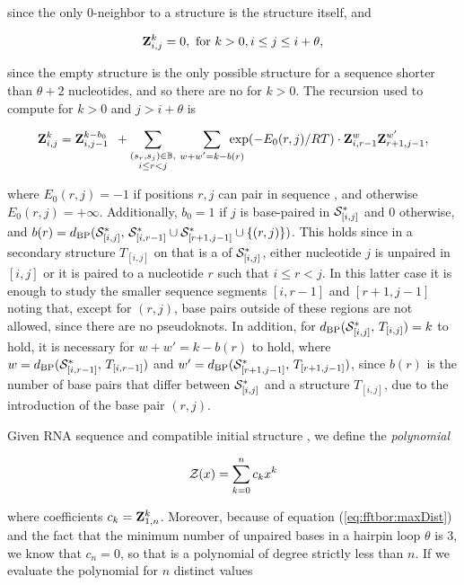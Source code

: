 since the only 0-neighbor to a structure \strSt
is the structure \strSt itself, and

\begin{align}
\label{eq:fftbor:initZpart2}
\bfZ{k}{i,j} = 0, \text{ for } k > 0, i \le j \leq i + \theta,
\end{align}

since the empty structure is the only possible structure for a
sequence shorter than $\theta + 2$ nucleotides, and so there are no
\kNbrs for $k>0$. The recursion used to compute
 for $k > 0$ and $j > i+\theta$ is

\begin{align}
\label{eq:fftbor:bfZkij}
\bfZ{k}{i,j} = \bfZ{k-b_0}{i,j-1}\enspace +
\sum_{\substack{(s_r,s_j) \in \bpSet, \\ i \leq r<j}}\qquad
\sum_{\mathclap{w+w'=k-b(r)}}\enspace
\exp(-E_0(r,j)/RT) \cdot \bfZ{w}{i,r-1} \bfZ{w'}{r+1,j-1},
\end{align}

where $E_0(r,j) = -1$ if positions $r,j$ can pair in sequence \seq,
and otherwise $E_0(r,j) = +\infty$. Additionally,
$b_0 = 1$ if $j$ is base-paired
in $\mathcal S^*_{[i,j]}$ and 0 otherwise, and
$b(r)=d_{\text{BP}}(\mathcal S^*_{[i,j]},\,\mathcal S^*_{[i,r-1]} \cup \mathcal S^*_{[r+1,j-1]} \cup\{(r,j)\})$.
This holds since in a secondary
structure $T_{[i,j]}$ on \seqIJ that is a \kNbr of
$\mathcal S^*_{[i,j]}$,
either nucleotide $j$ is unpaired in $[i,j]$ or it is
paired to a nucleotide $r$ such that $i \leq r < j$. In this
latter case it is enough to study the smaller sequence segments
$[i,r-1]$ and $[r+1,j-1]$ noting that, except for $(r,j)$,
base pairs outside of these regions are not allowed, since there
are no pseudoknots. In addition,
for $d_{\text{BP}}(\mathcal S^*_{[i,j]},\,T_{[i,j]}) = k$ to hold,
it is necessary for $w+w' = k -b(r)$ to hold, where $w =
d_{\text{BP}}(\mathcal S^*_{[i,r-1]},\,T_{[i,r-1]})$ and $w' =
d_{\text{BP}}(\mathcal S^*_{[r+1,j-1]},\,T_{[r+1,j-1]})$, since $b(r)$ is the
number of base pairs that differ between $\mathcal S^*_{[i,j]}$ and a
structure $T_{[i,j]}$, due to the introduction of the base pair
$(r,j)$.

Given RNA sequence \seq and compatible initial structure \strSt,
we define the {\em polynomial}

\begin{align}
\label{eq:fftbor:zOfX}
\emZ{} = \sum_{k=0}^n c_k x^k
\end{align}

where coefficients $c_k={\bf Z}^{k}_{1,n}$. Moreover, because of equation
(\ref{eq:fftbor:maxDist}) and the fact that the minimum number of
unpaired bases in a hairpin loop $\theta$ is 3, we know that $c_n=0$,
so that \emZ{} is a polynomial of degree strictly less than $n$.
If we evaluate the polynomial \emZ{} for $n$ distinct values

